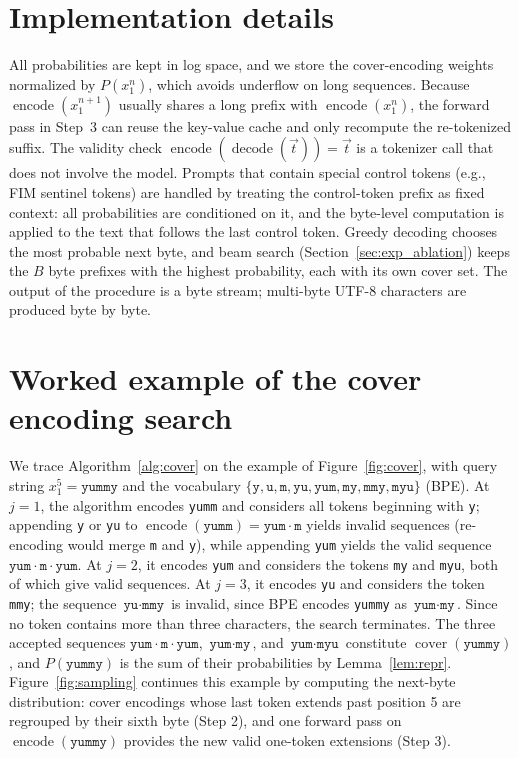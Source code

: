 \documentclass{article} %
\newcommand{\encf}{\operatorname{encode}}
\newcommand{\decf}{\operatorname{decode}}
\newcommand{\coverf}{\operatorname{cover}}
\newcommand{\str}[1]{\texttt{#1}}
\begin{document}
\section{Implementation details}
\label{app:impl}
All probabilities are kept in log space, and we store the cover-encoding weights normalized by $P(x_1^n)$, which avoids underflow on long sequences. Because $\encf(x_1^{n+1})$ usually shares a long prefix with $\encf(x_1^n)$, the forward pass in Step~3 can reuse the key-value cache and only recompute the re-tokenized suffix. The validity check $\encf(\decf(\vec{t}))=\vec{t}$ is a tokenizer call that does not involve the model. Prompts that contain special control tokens (e.g., FIM sentinel tokens) are handled by treating the control-token prefix as fixed context: all probabilities are conditioned on it, and the byte-level computation is applied to the text that follows the last control token. Greedy decoding chooses the most probable next byte, and beam search (Section~\ref{sec:exp_ablation}) keeps the $B$ byte prefixes with the highest probability, each with its own cover set. The output of the procedure is a byte stream; multi-byte UTF-8 characters are produced byte by byte.


\section{Worked example of the cover encoding search}
\label{app:example}
We trace Algorithm~\ref{alg:cover} on the example of Figure~\ref{fig:cover}, with query string $x_1^5=\str{yummy}$ and the vocabulary $\{\str{y},\str{u},\str{m},\str{yu},\str{yum},\str{my},\str{mmy},\str{myu}\}$ (BPE). At $j=1$, the algorithm encodes \str{yumm} and considers all tokens beginning with \str{y}; appending \str{y} or \str{yu} to $\encf(\str{yumm})=\str{yum}\cdot\str{m}$ yields invalid sequences (re-encoding would merge \str{m} and \str{y}), while appending \str{yum} yields the valid sequence $\str{yum}\cdot\str{m}\cdot\str{yum}$. At $j=2$, it encodes \str{yum} and considers the tokens \str{my} and \str{myu}, both of which give valid sequences. At $j=3$, it encodes \str{yu} and considers the token \str{mmy}; the sequence $\str{yu}\cdot\str{mmy}$ is invalid, since BPE encodes \str{yummy} as $\str{yum}\cdot\str{my}$. Since no token contains more than three characters, the search terminates. The three accepted sequences $\str{yum}\cdot\str{m}\cdot\str{yum}$, $\str{yum}\cdot\str{my}$, and $\str{yum}\cdot\str{myu}$ constitute $\coverf(\str{yummy})$, and $P(\str{yummy})$ is the sum of their probabilities by Lemma~\ref{lem:repr}. Figure~\ref{fig:sampling} continues this example by computing the next-byte distribution: cover encodings whose last token extends past position 5 are regrouped by their sixth byte (Step 2), and one forward pass on $\encf(\str{yummy})$ provides the new valid one-token extensions (Step 3).
\end{document}

